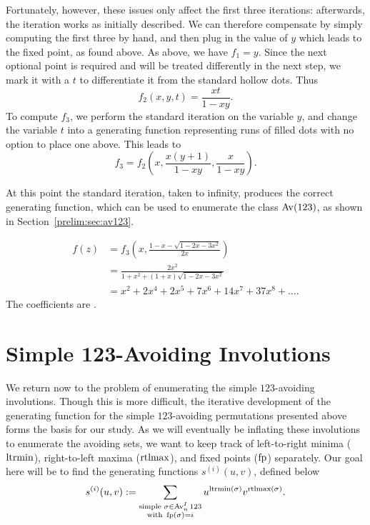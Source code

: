     Fortunately, however, these issues only affect the first three iterations:
    afterwards, the iteration works as initially described. We can therefore
    compensate by simply computing the first three by hand, and then plug in
    the value of $y$ which leads to the fixed point, as found above. 
    As above, we have $f_1 = y$. Since the next optional point is required and
    will be treated differently in the next step, we mark it with a $t$ to
    differentiate it from the standard hollow dots. Thus 
    $$ f_2(x,y,t) = \frac{xt}{1 - xy}.$$
    To compute $f_3$, we perform the standard iteration on the variable $y$,
    and change the variable $t$ into a generating function representing runs of
    filled dots with no option to place one above. This leads to 
    $$ f_3 = f_2 \left( x, \frac{x(y+1)}{1-xy}, \frac{x}{1-xy}\right).$$
  
    At this point the standard iteration, taken to infinity, produces the
    correct generating function, which can be used to enumerate the class $\operatorname{{Av}}
    (123)$, as shown in Section~\ref{prelim:sec:av123}. 


    \begin{equation} \label{eqn:genfcn-simple123perms}
    \begin{split}
      f(z) &= f_3\left(x, \frac{1 - x - \sqrt{1 - 2x - 3x^2}}{2x}\right) \\
        &= \frac{2x^2}{1 + x^2 + (1+x)\sqrt{1 - 2x - 3x^2}} \\
        &= x^2 + 2x^4 + 2x^5 + 7x^6 + 14x^7 + 37x^8 + \dots.
      \end{split}
    \end{equation}
    The coefficients are . 



\section{Simple 123-Avoiding Involutions}
\label{involutions:sec:123simples}

  We return now to the problem of enumerating the simple $123$-avoiding
  involutions. Though this is more difficult, the iterative development of the
  generating function for the simple $123$-avoiding permutations presented above
  forms the basis for our study. As we will eventually be inflating these
  involutions to enumerate the avoiding sets, we want to keep track of
  left-to-right minima ($\operatorname{{ltrmin}}$), right-to-left maxima ($\operatorname{{rtlmax}}$), and fixed
  points ($\operatorname{{fp}}$) separately.  Our goal here will be to find the generating
  functions $s^{(i)}(u,v)$, defined below
  $$ s^{(i)}(u,v) := \sum_{\substack{
            \text{simple } \sigma \in \operatorname{{Av}}_n^I 123 \\
            \text{with } \operatorname{{fp}}(\sigma) = i }}
            u^{\operatorname{{ltrmin}}(\sigma)} v^{\operatorname{{rtlmax}}(\sigma)} .$$

